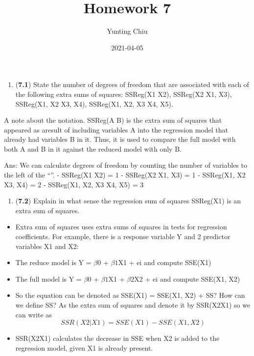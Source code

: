 \documentclass[
]{article}
\title{Homework 7}
\author{Yunting Chiu}
\date{2021-04-05}
\providecommand{\tightlist}{%
  \setlength{\itemsep}{0pt}\setlength{\parskip}{0pt}}
\begin{document}
\maketitle

\begin{enumerate}
\def\labelenumi{\arabic{enumi}.}
\tightlist
\item
  (\textbf{7.1}) State the number of degrees of freedom that are
  associated with each of the following extra sums of squares: SSReg(X1
  \textbar{} X2), SSReg(X2 \textbar{} X1, X3), SSReg(X1, X2 \textbar{}
  X3, X4), SSReg(X1, X2, X3 \textbar{} X4, X5).
\end{enumerate}

A note about the notation. SSReg(A \textbar{} B) is the extra sum of
squares that appeared as aresult of including variables A into the
regression model that already had variables B in it. Thus, it is used to
compare the full model with both A and B in it against the reduced model
with only B.

Ans: We can calculate degrees of freedom by counting the number of
variables to the left of the ``\textbar{}''. - SSReg(X1 \textbar{} X2) =
1 - SSReg(X2 \textbar{} X1, X3) = 1 - SSReg(X1, X2 \textbar{} X3, X4) =
2 - SSReg(X1, X2, X3 \textbar{} X4, X5) = 3

\begin{enumerate}
\def\labelenumi{\arabic{enumi}.}
\setcounter{enumi}{1}
\tightlist
\item
  (\textbf{7.2}) Explain in what sense the regression sum of squares
  SSReg(X1) is an extra sum of squares.
\end{enumerate}

\begin{itemize}
\tightlist
\item
  Extra sum of squares uses extra sums of squares in tests for
  regression coefficients. For example, there is a response variable Y
  and 2 predictor variables X1 and X2:
\item
  The reduce model is Y = \(\beta0\) + \(\beta1\)X1 + ei and compute
  SSE(X1)
\item
  The full model is Y = \(\beta0\) + \(\beta1\)X1 + \(\beta2\)X2 + ei
  and compute SSE(X1, X2)
\item
  So the equation can be denoted as SSE(X1) = SSE(X1, X2) + SS? How can
  we define SS? As the extra sum of squares and denote it by
  SSR(X2\textbar X1) so we can write as \[
  SSR(X2|X1) = SSE(X1) − SSE(X1, X2)
  \]
\item
  SSR(X2\textbar X1) calculates the decrease in SSE when X2 is added to
  the regression model, given X1 is already present.
\end{itemize}
\end{document}
